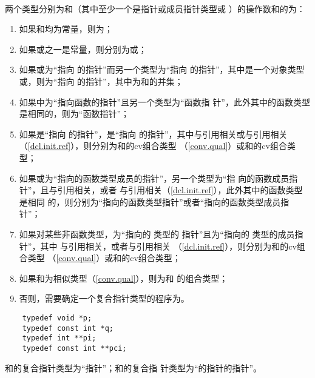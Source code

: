 \paragraph{} %
两个类型分别为和（其中至少一个是指针或成员指针类型或
）的操作数和的为：
\begin{enumerate}
  \item 如果和均为\nullp{}常量，则为；
  \item 如果或之一是\nullp{}常量，则分别为或；
  \item 如果或为“指向 的指针”而另一个类型为“指向
         的指针”，其中是一个对象类型或，则为“指向
         的指针”，其中为和的并集；
  \item 如果中为“指向函数的指针”且另一个类型为“函数指
        针”，此外其中的函数类型是相同的，则为“函数指针”；
  \item 如果是“指向 的指针”，是“指向
        的指针”，其中与引用相关或与引用相关
        （\ref{dcl.init.ref}），则分别为和的cv组合类型
        （\ref{conv.qual}）或和的cv组合类型；
  \item 如果或为“指向的函数类型成员的指针”，另一个类型为“指
        向的函数成员指针”，且与引用相关，或者
        与引用相关（\ref{dcl.init.ref}），此外其中的函数类型是相同
        的，则分别为“指向的函数类型指针”或者“指向的函数类型成员指
        针”；
  \item 如果对某些非函数类型，为“指向的 类型的
        指针”且为“指向的 类型的成员指针”，其中
        与引用相关，或者与引用相关
        （\ref{dcl.init.ref}），则分别为和的cv组合类型
        （\ref{conv.qual}）或和的cv组合类型；
  \item 如果和为相似类型（\ref{conv.qual}），则为和
        的组合类型；
  \item 否则，需要确定一个复合指针类型的程序为\illform{}。
\end{enumerate}
\begin{example}
  \begin{lstlisting}
    typedef void *p;
    typedef const int *q;
    typedef int **pi;
    typedef const int **pci;
  \end{lstlisting}
  和的复合指针类型为“指针”；和的复合指
  针类型为“的指针的指针”。
\end{example}
